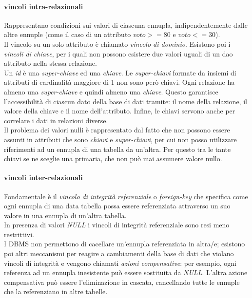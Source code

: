 \paragraph{vincoli intra-relazionali}
Rappresentano condizioni sui valori di ciascuna ennupla, indipendentemente dalle altre ennuple (come il caso di un attributo $voto >= 80$ e $voto <= 30$). \\
Il vincolo su un solo attributo è chiamato \textit{vincolo di dominio}. Esistono poi i \textit{vincoli di chiave}, per i quali non possono esistere due valori uguali di un dao attributo nella stessa relazione. \\
Un \textit{id} è una \textit{super-chiave} ed una \textit{chiave}. Le \textit{super-chiavi} formate da insiemi di attributi di cardinalità maggiore di 1 non sono però chiavi. Ogni relazione ha almeno una \textit{super-chiave} e quindi almeno una \textit{chiave}. Questo garantisce l'accessibilità di ciascun dato della base di dati tramite: il nome della relazione, il valore della chiave e il nome dell'attributo. Infine, le chiavi servono anche per correlare i dati in relazioni diverse. \\
Il problema dei valori nulli è rappresentato dal fatto che non possono essere assunti in attributi che sono \textit{chiavi} e \textit{super-chiavi}, per cui non posso utilizzare riferimenti ad un ennupla di una tabella da un'altra. Per questo tra le tante chiavi se ne sceglie una primaria, che non può mai assumere valore nullo.

\paragraph{vincoli inter-relazionali}
Fondamentale è il \textit{vincolo di integrità referenziale} o \textit{foreign-key} che specifica come ogni ennupla di una data tabella possa essere referenziata attraverso un suo valore in una ennupla di un'altra tabella. \\
In presenza di valori \textit{NULL} i vincoli di integrità referenziale sono resi meno restrittivi. \\
I DBMS non permettono di cacellare un'ennupla referenziata in altra/e; esistono poi altri meccanismi per reagire a cambiamenti della base di dati che violano vincoli di integrità e vengono chiamati \textit{azioni compensative}: per esempio, ogni referenza ad un ennupla inesistente può essere sostituita da \textit{NULL}. L'altra azione compensativa può essere l'eliminazione in cascata, cancellando tutte le ennuple che la referenziano in altre tabelle.

